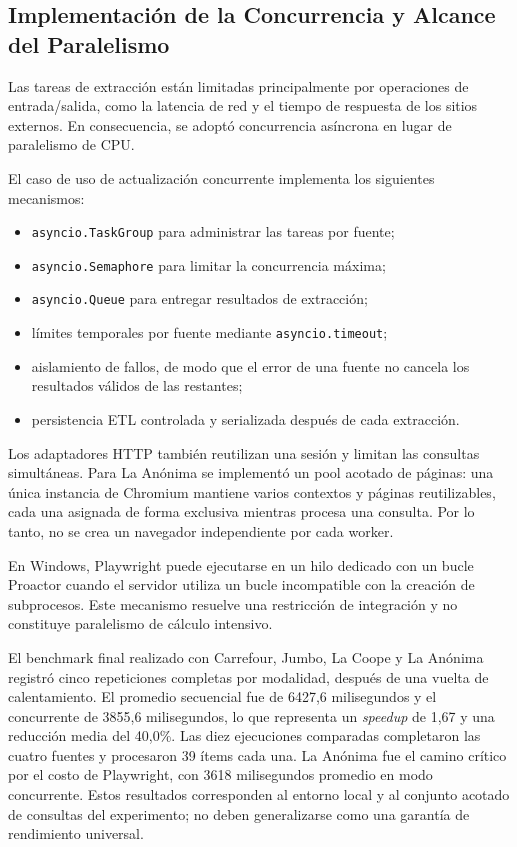 \subsection{Implementación de la Concurrencia y Alcance del Paralelismo}

Las tareas de extracción están limitadas principalmente por operaciones de
entrada/salida, como la latencia de red y el tiempo de respuesta de los sitios
externos. En consecuencia, se adoptó concurrencia asíncrona en lugar de
paralelismo de CPU.

El caso de uso de actualización concurrente implementa los siguientes
mecanismos:

\begin{itemize}
    \item \texttt{asyncio.TaskGroup} para administrar las tareas por fuente;
    \item \texttt{asyncio.Semaphore} para limitar la concurrencia máxima;
    \item \texttt{asyncio.Queue} para entregar resultados de extracción;
    \item límites temporales por fuente mediante \texttt{asyncio.timeout};
    \item aislamiento de fallos, de modo que el error de una fuente no cancela
    los resultados válidos de las restantes;
    \item persistencia ETL controlada y serializada después de cada extracción.
\end{itemize}

Los adaptadores HTTP también reutilizan una sesión y limitan las consultas
simultáneas. Para La Anónima se implementó un pool acotado de páginas: una única
instancia de Chromium mantiene varios contextos y páginas reutilizables, cada
una asignada de forma exclusiva mientras procesa una consulta. Por lo tanto, no
se crea un navegador independiente por cada worker.

En Windows, Playwright puede ejecutarse en un hilo dedicado con un bucle Proactor
cuando el servidor utiliza un bucle incompatible con la creación de subprocesos.
Este mecanismo resuelve una restricción de integración y no constituye
paralelismo de cálculo intensivo.

El benchmark final realizado con Carrefour, Jumbo, La Coope y La Anónima
registró cinco repeticiones completas por modalidad, después de una vuelta de
calentamiento. El promedio secuencial fue de 6427,6 milisegundos y el concurrente
de 3855,6 milisegundos, lo que representa un \textit{speedup} de 1,67 y una
reducción media del 40,0\%. Las diez ejecuciones comparadas completaron las cuatro
fuentes y procesaron 39 ítems cada una. La Anónima fue el camino crítico por el
costo de Playwright, con 3618 milisegundos promedio en modo concurrente. Estos
resultados corresponden al entorno local y al conjunto acotado de consultas del
experimento; no deben generalizarse como una garantía de rendimiento universal.


